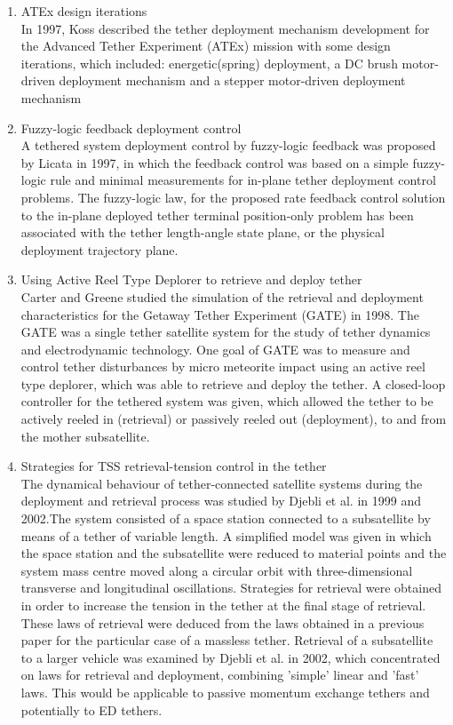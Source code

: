 \begin{enumerate}

\item ATEx design iterations \\
In 1997, Koss described the tether deployment mechanism development for the Advanced Tether Experiment (ATEx) mission with some design iterations, which included: energetic(spring) deployment, a DC brush motor-driven deployment mechanism and a stepper motor-driven deployment mechanism

\item Fuzzy-logic feedback deployment control\\
A tethered system deployment control by fuzzy-logic feedback was proposed by Licata in 1997, in which the feedback control was based on a simple fuzzy-logic rule and minimal measurements for in-plane tether deployment control problems. The fuzzy-logic law, for the proposed rate feedback control solution to the in-plane deployed tether terminal position-only problem has been associated with the tether length-angle state plane, or the physical deployment trajectory plane.

\item Using Active Reel Type Deplorer to retrieve and deploy tether\\
Carter and Greene studied the simulation of the retrieval and deployment characteristics for the Getaway Tether Experiment (GATE) in 1998. The GATE was a single tether satellite system for the study of tether dynamics and electrodynamic technology. One goal of GATE was to measure and control tether disturbances by micro meteorite impact using an active reel type deplorer, which was able to retrieve and deploy the tether. A closed-loop controller for the tethered system was given, which allowed the tether to be actively reeled in (retrieval) or passively reeled out (deployment), to and from the mother subsatellite.

\item Strategies for TSS retrieval-tension control in the tether\\
The dynamical behaviour of tether-connected satellite systems during the deployment and retrieval process was studied by Djebli et al. in 1999 and 2002.The system consisted of a space station connected to a subsatellite by means of a tether of variable length. A simplified model was given in which the space station and the subsatellite were reduced to material points and the system mass centre moved along a circular orbit with three-dimensional transverse and longitudinal oscillations. Strategies for retrieval were obtained in order to increase the tension in the tether at the final stage of retrieval. These laws of retrieval were deduced from the laws obtained in a previous paper for the particular case of a massless tether. Retrieval of a subsatellite to a larger vehicle was examined by Djebli et al. in 2002, which concentrated on laws for retrieval and deployment, combining 'simple' linear and 'fast' laws. This would be applicable to passive momentum exchange tethers and potentially to ED tethers.



\end{enumerate}
